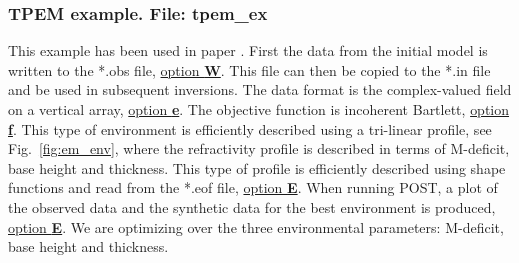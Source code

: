 \documentclass{saclantc}
\begin{document}
\subsubsection{TPEM example. File: {\bf tpem\_ex} }
\label{se:tpem-ex}
This example has been used in paper \cite{gingras:ieee97}.
First  the data from the initial model is written to the *.obs file,
\underline{option {\bf W}}. This file can then be copied to the *.in file
and be used in subsequent inversions.
 The data format is the complex-valued field on a vertical array, 
\underline{option {\bf e}}.
The objective function is incoherent Bartlett, \underline{option {\bf f}}.
This type of environment is efficiently described using a tri-linear
profile, see Fig.~\ref{fig:em_env}, where the refractivity profile is
described in terms of M-deficit, base height and thickness. 
This type of profile is efficiently described using
 shape functions and read from the *.eof file, \underline{option {\bf E}}.
When running {\sf POST}, a plot of the observed 
data and the synthetic data for the best environment is produced, \underline{option {\bf E}}.
We are optimizing over the three environmental parameters: M-deficit, base height and thickness. 
\end{document}
